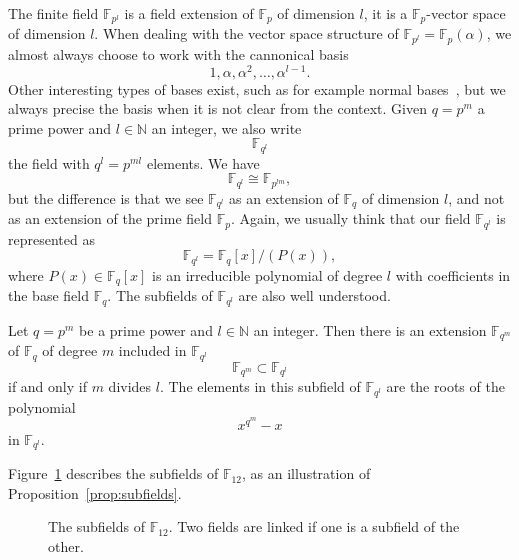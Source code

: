 The finite field $\mathbb{F}_{p^l}$ is a
field extension of $\mathbb{F}_{p}$ of dimension $l$, \ie it is a
$\mathbb{F}_{p}$-vector space of dimension $l$. When dealing with the vector
space structure of $\mathbb{F}_{p^l}=\mathbb{F}_{p}(\alpha)$, we almost always choose to work with the
cannonical basis 
\[
  1, \alpha, \alpha^2, \dots, \alpha^{l-1}.
\]
Other interesting types of bases exist, such as for example normal
bases~\cite{Gao93}, but we always precise the basis when it is not clear from
the context.
Given $q=p^m$ a prime power and
$l\in\mathbb{N}$ an integer, we also write 
\[
  \mathbb{F}_{q^l}
\]
the field with $q^l = p^{ml}$ elements. We have
\[
  \mathbb{F}_{q^l}\cong\mathbb{F}_{p^{lm}},
\]
but the difference is that we see $\mathbb{F}_{q^l}$ as an extension of
$\mathbb{F}_{q}$ of dimension $l$, and not as an extension of the prime field
$\mathbb{F}_p$. Again, we usually think that our field $\mathbb{F}_{q^l}$ is
represented as
\[
  \mathbb{F}_{q^l}=\mathbb{F}_q[x]/(P(x)),
\]
where $P(x)\in\mathbb{F}_{q}[x]$ is an irreducible polynomial of degree $l$ with
coefficients in the base field $\mathbb{F}_q$. The subfields of
$\mathbb{F}_{q^l}$ are also well understood.
\begin{prop}
  \label{prop:subfields}
  Let $q=p^m$ be a prime power and $l\in\mathbb{N}$ an integer. Then there is
  an extension $\mathbb{F}_{q^m}$ of $\mathbb{F}_q$ of degree $m$ 
  included in $\mathbb{F}_{q^l}$
  \[
    \mathbb{F}_{q^m}\subset\mathbb{F}_{q^l}
  \]
  if and only if $m$ divides
  $l$. The elements in this subfield of $\mathbb{F}_{q^l}$ are the roots of the
  polynomial
  \[
    x^{q^m}-x
  \]
  in $\mathbb{F}_{q^l}$.
\end{prop}
Figure~\ref{fig:F12} describes the subfields of $\mathbb{F}_{12}$, as an
illustration of Proposition~\ref{prop:subfields}.
\begin{figure}
  \centering
  \caption{The subfields of $\mathbb{F}_{12}$. Two fields are linked if one is a
subfield of the other.}
  \label{fig:F12}
\end{figure}
